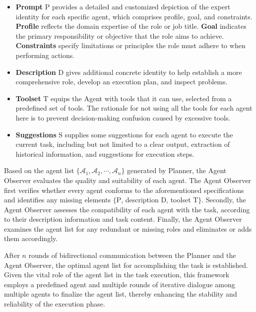 \begin{itemize}
    \item \textbf{Prompt} $\mathrm{P}$  provides a detailed and customized depiction of the expert identity for each specific agent, which comprises profile, goal, and constraints. \textbf{Profile} reflects the domain expertise of the role or job title. \textbf{Goal} indicates the primary responsibility or objective that the role aims to achieve. \textbf{Constraints} specify limitations or principles the role must adhere to when performing actions. %
    \item \textbf{Description} $\mathrm{D}$  gives additional concrete identity to help establish a more comprehensive role, develop an execution plan, and inspect problems. %
    \item \textbf{Toolset} $\mathrm{T}$ equips the Agent with tools that it can use, selected from a predefined set of tools. The rationale for not using all the tools for each agent here is to prevent decision-making confusion caused by excessive tools.
    \item \textbf{Suggestions} $\mathrm{S}$ supplies some suggestions for each agent to execute the current task, including but not limited to a clear output, extraction of historical information, and suggestions for execution steps.
\end{itemize}

Based on the agent list $\{\mathcal{A}_1, \mathcal{A}_2, \cdots, \mathcal{A}_n\}$ generated by Planner, the Agent Observer evaluates the quality and suitability of each agent. The Agent Observer first verifies whether every agent conforms to the aforementioned specifications and identifies any missing elements $\{\mathrm{P}$, description $\mathrm{D}$, toolset $\mathrm{T}\}$. Secondly, the Agent Observer assesses the compatibility of each agent with the task, according to their description information and task content. Finally, the Agent Observer examines the agent list for any redundant or missing roles and eliminates or adds them accordingly.

After $n$ rounds of bidirectional communication between the Planner and the Agent Observer, the optimal agent list for accomplishing the task is established. Given the vital role of the agent list in the task execution, this framework employs a predefined agent and multiple rounds of iterative dialogue among multiple agents to finalize the agent list, thereby enhancing the stability and reliability of the execution phase.

